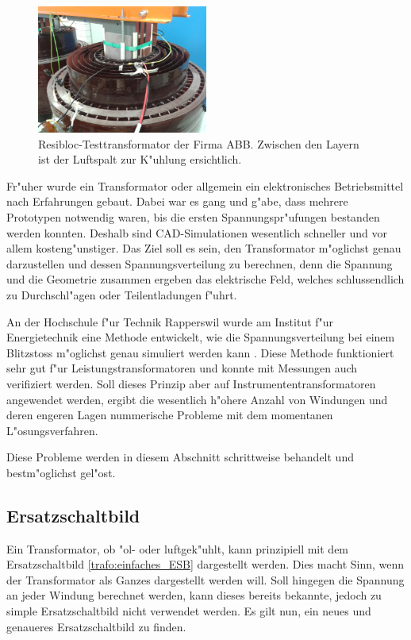\begin{refsection}
\begin{figure}
	\centering
	\includegraphics[width=0.5\textwidth]{./trafo/images/resibloc.jpg}
	\caption{Resibloc-Testtransformator der Firma ABB. Zwischen den Layern ist der Luftspalt zur K"uhlung ersichtlich.}
	\label{trafo:resibloc}
\end{figure}
Fr"uher wurde ein Transformator oder allgemein ein elektronisches Betriebsmittel nach Erfahrungen gebaut. Dabei war es gang und g"abe, dass mehrere Prototypen notwendig waren, bis die ersten Spannungspr"ufungen bestanden werden konnten. Deshalb sind CAD-Simulationen wesentlich schneller und vor allem kosteng"unstiger. Das Ziel soll es sein, den Transformator m"oglichst genau darzustellen und dessen Spannungsverteilung zu berechnen, denn die Spannung und die Geometrie zusammen ergeben das elektrische Feld, welches schlussendlich zu Durchschl"agen oder Teilentladungen f"uhrt.

An der Hochschule f"ur Technik Rapperswil wurde am Institut f"ur Energietechnik eine Methode entwickelt, wie die Spannungsverteilung bei einem Blitzstoss m"oglichst genau simuliert werden kann \cite{trafo:BILImpulse}. Diese Methode funktioniert sehr gut f"ur Leistungstransformatoren und konnte mit Messungen auch verifiziert werden. 
Soll dieses Prinzip aber auf Instrumententransformatoren angewendet werden, ergibt die wesentlich h"ohere Anzahl von Windungen und deren engeren Lagen nummerische Probleme mit dem momentanen L"osungsverfahren. 

Diese Probleme werden in diesem Abschnitt schrittweise behandelt und bestm"oglichst gel"ost. 


\subsection{Ersatzschaltbild}
Ein Transformator, ob "ol- oder luftgek"uhlt, kann prinzipiell mit dem Ersatzschaltbild \ref{trafo:einfaches_ESB} dargestellt werden. Dies macht Sinn, wenn der Transformator als Ganzes dargestellt werden will. Soll hingegen die Spannung an jeder Windung berechnet werden, kann dieses bereits bekannte, jedoch zu simple Ersatzschaltbild nicht verwendet werden. Es gilt nun, ein neues und genaueres Ersatzschaltbild zu finden. 


\end{refsection}
